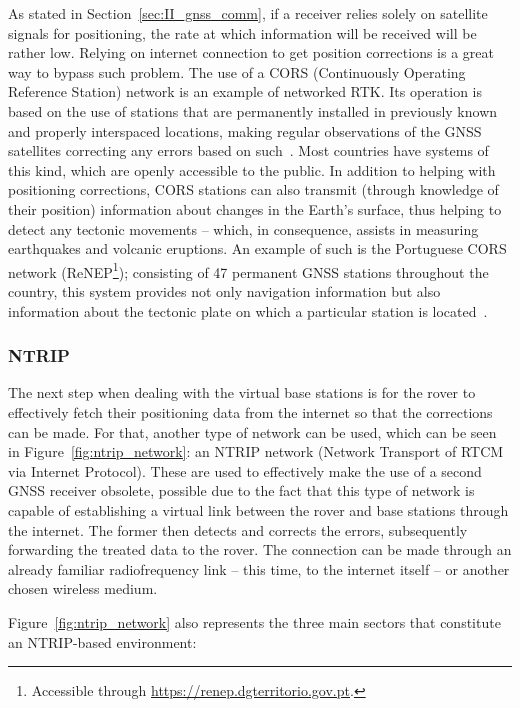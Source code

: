 As stated in Section~\ref{sec:II_gnss_comm}, if a receiver relies solely on satellite signals for positioning, the rate at which information will be received will be rather low. Relying on internet connection to get position corrections is a great way to bypass such problem. The use of a CORS (Continuously Operating Reference Station) network is an example of networked RTK. Its operation is based on the use of stations that are permanently installed in previously known and properly interspaced locations, making regular observations of the GNSS satellites correcting any errors based on such~\cite{novatel_gnss}.
Most countries have systems of this kind, which are openly accessible to the public. In addition to helping with positioning corrections, CORS stations can also transmit (through knowledge of their position) information about changes in the Earth's surface, thus helping to detect any tectonic movements -- which, in consequence, assists in measuring earthquakes and volcanic eruptions. An example of such is the Portuguese CORS network (ReNEP\footnote{Accessible through \url{https://renep.dgterritorio.gov.pt}.}); consisting of 47 permanent GNSS stations throughout the country, this system provides not only navigation information but also information about the tectonic plate on which a particular station is located~\cite{ReNEP_ppt_2018}.

\subsubsection{NTRIP}\label{sec:II_networkedRTK_ntrip}

The next step when dealing with the virtual base stations is for the rover to effectively fetch their positioning data from the internet so that the corrections can be made. For that, another type of network can be used, which can be seen in Figure~\ref{fig:ntrip_network}: an NTRIP network (Network Transport of RTCM via Internet Protocol). These are used to effectively make the use of a second GNSS receiver obsolete, possible due to the fact that this type of network is capable of establishing a virtual link between the rover and base stations through the internet. The former then detects and corrects the errors, subsequently forwarding the treated data to the rover. The connection can be made through an already familiar radiofrequency link -- this time, to the internet itself -- or another chosen wireless medium.

Figure~\ref{fig:ntrip_network} also represents the three main sectors that constitute an NTRIP-based environment:

